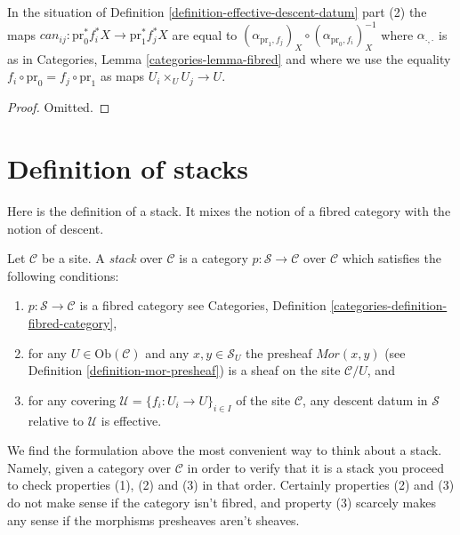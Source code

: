 \begin{lemma}
\label{lemma-trivial-cocycle}
In the situation of
Definition \ref{definition-effective-descent-datum} part (2) the maps
$can_{ij} : \text{pr}_0^*f_i^*X \to \text{pr}_1^*f_j^*X$ are equal to
$(\alpha_{\text{pr}_1, f_j})_X \circ (\alpha_{\text{pr}_0, f_i})_X^{-1}$
where $\alpha_{\cdot, \cdot}$ is as in
Categories, Lemma \ref{categories-lemma-fibred}
and where we
use the equality $f_i \circ \text{pr}_0 = f_j \circ \text{pr}_1$
as maps $U_i \times_U U_j \to U$.
\end{lemma}

\begin{proof}
Omitted.
\end{proof}












\section{Definition of stacks}
\label{section-definition}

\noindent
Here is the definition of a stack. It mixes the notion of a fibred
category with the notion of descent.

\begin{definition}
\label{definition-stack}
Let $\mathcal{C}$ be a site. A {\it stack} over $\mathcal{C}$
is a category $p : \mathcal{S} \to \mathcal{C}$ over $\mathcal{C}$ which
satisfies the following conditions:
\begin{enumerate}
\item $p : \mathcal{S} \to \mathcal{C}$ is a fibred category
see Categories, Definition \ref{categories-definition-fibred-category},
\item for any $U \in \text{Ob}(\mathcal{C})$ and any $x, y \in \mathcal{S}_U$
the presheaf $\mathit{Mor}(x, y)$ (see
Definition \ref{definition-mor-presheaf}) is a sheaf on
the site $\mathcal{C}/U$, and
\item for any covering $\mathcal{U} = \{f_i : U_i \to U\}_{i \in I}$
of the site $\mathcal{C}$, any descent datum in $\mathcal{S}$
relative to $\mathcal{U}$ is effective.
\end{enumerate}
\end{definition}

\noindent
We find the formulation above the most convenient way to think about
a stack. Namely, given a category over $\mathcal{C}$ in order to verify
that it is a stack you proceed to check properties (1), (2) and
(3) in that order. Certainly properties (2) and (3) do not make sense
if the category isn't fibred, and property (3) scarcely makes any sense
if the morphisms presheaves aren't sheaves.

